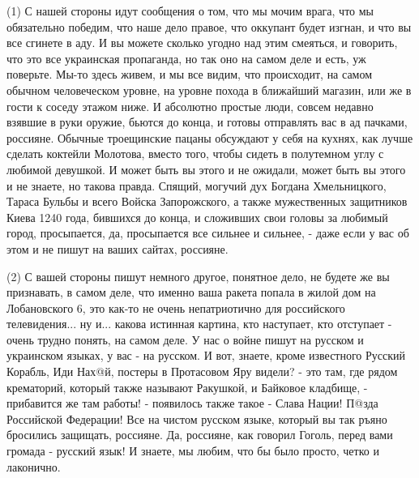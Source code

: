 (1) С нашей стороны идут сообщения о том, что мы мочим врага, что мы
обязательно победим, что наше дело правое, что оккупант будет изгнан, и что вы
все сгинете в аду. И вы можете сколько угодно над этим смеяться, и говорить,
что это все украинская пропаганда, но так оно на самом деле и есть, уж
поверьте.  Мы-то здесь живем, и мы все видим, что происходит, на самом обычном
человеческом уровне, на уровне похода в ближайший магазин, или же в гости к
соседу этажом ниже. И абсолютно простые люди, совсем недавно взявшие в руки
оружие, бьются до конца, и готовы отправлять вас в ад пачками, россияне.
Обычные троещинские пацаны обсуждают у себя на кухнях, как лучше сделать
коктейли Молотова, вместо того, чтобы сидеть в полутемном углу с любимой
девушкой. И может быть вы этого и не ожидали, может быть вы этого и не знаете,
но такова правда.  Спящий, могучий дух Богдана Хмельницкого, Тараса Бульбы и
всего Войска Запорожского, а также мужественных защитников Киева 1240 года,
бившихся до конца, и сложивших свои головы за любимый город, просыпается, да,
просыпается все сильнее и сильнее, - даже если у вас об этом и не пишут на
ваших сайтах, россияне.

(2) С вашей стороны пишут немного другое, понятное дело, не будете же вы
признавать, в самом деле, что именно ваша ракета попала в жилой дом на Лобановского 6,
это как-то не очень непатриотично для российского телевидения... ну и... какова истинная
картина, кто наступает, кто отступает - очень трудно понять, на самом деле. У
нас о войне пишут на русском и украинском языках, у вас - на русском. И вот,
знаете, кроме известного Русский Корабль, Иди Нах@й, постеры в Протасовом Яру
видели? - это там, где рядом крематорий, который также называют Ракушкой, и
Байковое кладбище, - прибавится же там работы! - появилось также такое - Слава
Нации!  П@зда Российской Федерации! Все на чистом русском языке, который вы так
ръяно бросились защищать, россияне. Да, россияне, как говорил Гоголь, перед
вами громада - русский язык! И знаете, мы любим, что бы было просто, четко и лаконично.

